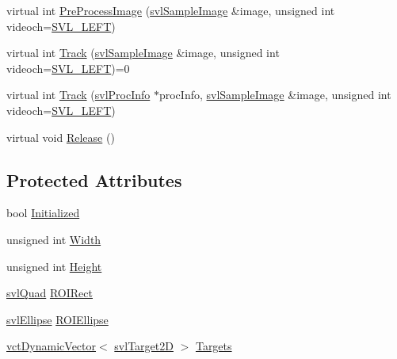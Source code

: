 \begin{DoxyCompactItemize}
virtual int \hyperlink{classsvl_image_tracker_a817d28eaf0a20c73273e7c9060c03ebf}{Pre\-Process\-Image} (\hyperlink{classsvl_sample_image}{svl\-Sample\-Image} \&image, unsigned int videoch=\hyperlink{svl_definitions_8h_ab9fec7615f19c8df2919eebcab0b187f}{S\-V\-L\-\_\-\-L\-E\-F\-T})
\item 
virtual int \hyperlink{classsvl_image_tracker_aa806fe1fe56828124a85cb81e0d7bd7f}{Track} (\hyperlink{classsvl_sample_image}{svl\-Sample\-Image} \&image, unsigned int videoch=\hyperlink{svl_definitions_8h_ab9fec7615f19c8df2919eebcab0b187f}{S\-V\-L\-\_\-\-L\-E\-F\-T})=0
\item 
virtual int \hyperlink{classsvl_image_tracker_af1307ba743f3b10c5596a2307dd7217c}{Track} (\hyperlink{structsvl_proc_info}{svl\-Proc\-Info} $\ast$proc\-Info, \hyperlink{classsvl_sample_image}{svl\-Sample\-Image} \&image, unsigned int videoch=\hyperlink{svl_definitions_8h_ab9fec7615f19c8df2919eebcab0b187f}{S\-V\-L\-\_\-\-L\-E\-F\-T})
\item 
virtual void \hyperlink{classsvl_image_tracker_a08ca47278e9d55b83f081c10e1159340}{Release} ()
\end{DoxyCompactItemize}
\subsection*{Protected Attributes}
\begin{DoxyCompactItemize}
\item 
bool \hyperlink{classsvl_image_tracker_ad5478f0908bc03e76fb876e43aa1deae}{Initialized}
\item 
unsigned int \hyperlink{classsvl_image_tracker_a6bad5bd6edbd63f8a350203afe26dea6}{Width}
\item 
unsigned int \hyperlink{classsvl_image_tracker_a0ff4ce15e78b8699cb891123daaa7231}{Height}
\item 
\hyperlink{structsvl_quad}{svl\-Quad} \hyperlink{classsvl_image_tracker_a89ce7f905564fec40407e77aa898e465}{R\-O\-I\-Rect}
\item 
\hyperlink{structsvl_ellipse}{svl\-Ellipse} \hyperlink{classsvl_image_tracker_aedd5673ace2aef2c64c0e0b5a52f7e14}{R\-O\-I\-Ellipse}
\item 
\hyperlink{classvct_dynamic_vector}{vct\-Dynamic\-Vector}$<$ \hyperlink{structsvl_target2_d}{svl\-Target2\-D} $>$ \hyperlink{classsvl_image_tracker_acc589d98d13de77df8a2eed855df9d28}{Targets}
\end{DoxyCompactItemize}


